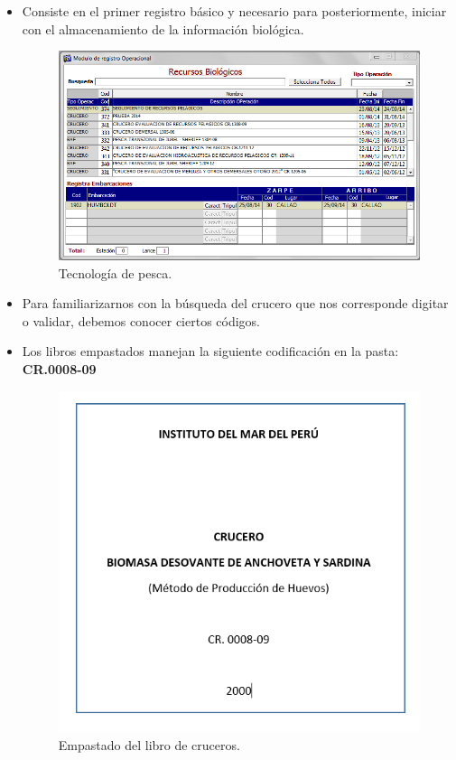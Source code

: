 \documentclass[a4paper,oneside,11pt]{book}
\begin{document}
\begin{itemize}
\item Consiste en el primer registro básico y necesario para posteriormente, iniciar con el almacenamiento de la información biológica. 

 \begin{figure} [!h]
   \begin{center}
   \includegraphics[scale=0.7]{imagen_manual_OPEMAR/tecno.png}
    \caption{Tecnología de pesca.}
   \end{center}
    \end{figure}
 
  \newpage
 
 \item Para familiarizarnos con la búsqueda del crucero que nos corresponde digitar o validar, debemos conocer ciertos códigos.
 
 \item Los libros empastados manejan la siguiente codificación en la pasta: \textbf{CR.0008-09  }
 
 \begin{figure} [!h]
    \begin{center}
    \includegraphics[scale=0.8]{imagen_manual_OPEMAR/pasta.png}
     \caption{Empastado del libro de cruceros.}
    \end{center}
     \end{figure}
 

\end{itemize}
\end{document}
